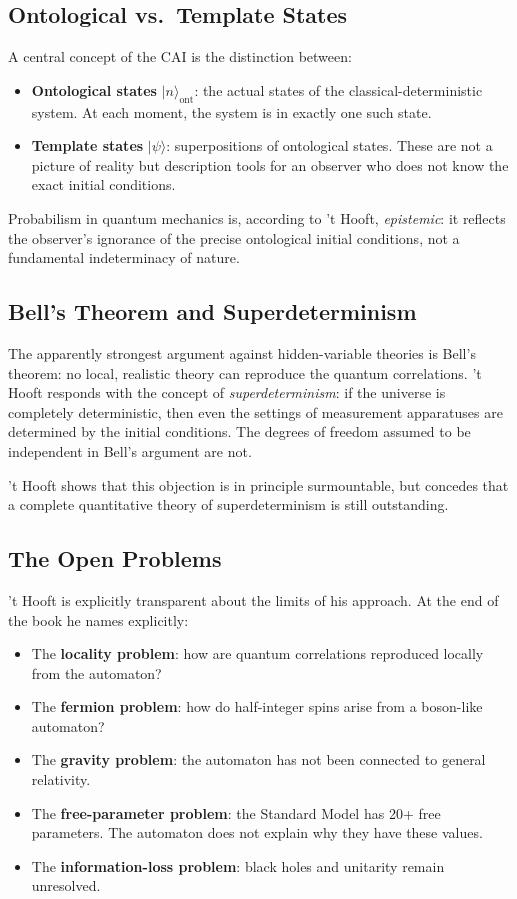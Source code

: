 \subsection{Ontological vs.\ Template States}

A central concept of the CAI is the distinction between:
\begin{itemize}
    \item \textbf{Ontological states} $|n\rangle_{\text{ont}}$: the actual states
    of the classical-deterministic system. At each moment, the system is in exactly
    one such state.
    \item \textbf{Template states} $|\psi\rangle$: superpositions of ontological
    states. These are not a picture of reality but description tools for an observer
    who does not know the exact initial conditions.
\end{itemize}

Probabilism in quantum mechanics is, according to 't Hooft, \emph{epistemic}: it
reflects the observer's ignorance of the precise ontological initial conditions,
not a fundamental indeterminacy of nature.

\subsection{Bell's Theorem and Superdeterminism}

The apparently strongest argument against hidden-variable theories is Bell's
theorem: no local, realistic theory can reproduce the quantum correlations.
't Hooft responds with the concept of \emph{superdeterminism}: if the universe
is completely deterministic, then even the settings of measurement apparatuses
are determined by the initial conditions. The degrees of freedom assumed to be
independent in Bell's argument are not.

't Hooft shows that this objection is in principle surmountable, but concedes
that a complete quantitative theory of superdeterminism is still outstanding.

\subsection{The Open Problems}

't Hooft is explicitly transparent about the limits of his approach. At the end
of the book he names explicitly:
\begin{itemize}
    \item The \textbf{locality problem}: how are quantum correlations reproduced
    locally from the automaton?
    \item The \textbf{fermion problem}: how do half-integer spins arise from a
    boson-like automaton?
    \item The \textbf{gravity problem}: the automaton has not been connected to
    general relativity.
    \item The \textbf{free-parameter problem}: the Standard Model has 20+ free
    parameters. The automaton does not explain why they have these values.
    \item The \textbf{information-loss problem}: black holes and unitarity remain
    unresolved.
\end{itemize}

